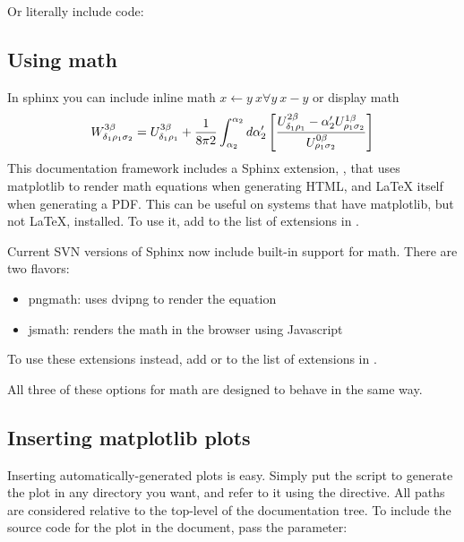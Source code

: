 \documentclass[letterpaper,10pt,openany, oneside]{sphinxmanual}
\begin{document}
Or literally include code:


\subsection{Using math}
\label{sample:id5}\label{sample:using-math}
In sphinx you can include inline math $x\leftarrow y\ x\forall
y\ x-y$ or display math
\begin{gather}
\begin{split}W^{3\beta}_{\delta_1 \rho_1 \sigma_2} = U^{3\beta}_{\delta_1 \rho_1} + \frac{1}{8 \pi 2} \int^{\alpha_2}_{\alpha_2} d \alpha^\prime_2 \left[\frac{ U^{2\beta}_{\delta_1 \rho_1} - \alpha^\prime_2U^{1\beta}_{\rho_1 \sigma_2} }{U^{0\beta}_{\rho_1 \sigma_2}}\right]\end{split}\notag
\end{gather}
This documentation framework includes a Sphinx extension,
, that uses matplotlib to render math
equations when generating HTML, and LaTeX itself when generating a
PDF.  This can be useful on systems that have matplotlib, but not
LaTeX, installed.  To use it, add  to the list of
extensions in .

Current SVN versions of Sphinx now include built-in support for math.
There are two flavors:
\begin{itemize}
\item {} 
pngmath: uses dvipng to render the equation

\item {} 
jsmath: renders the math in the browser using Javascript

\end{itemize}

To use these extensions instead, add  or
 to the list of extensions in .

All three of these options for math are designed to behave in the same
way.


\subsection{Inserting matplotlib plots}
\label{sample:inserting-matplotlib-plots}
Inserting automatically-generated plots is easy.  Simply put the script to
generate the plot in any directory you want, and refer to it using the 
directive.  All paths are considered relative to the top-level of the
documentation tree.  To include the source code for the plot in the document,
pass the  parameter:
\end{document}
